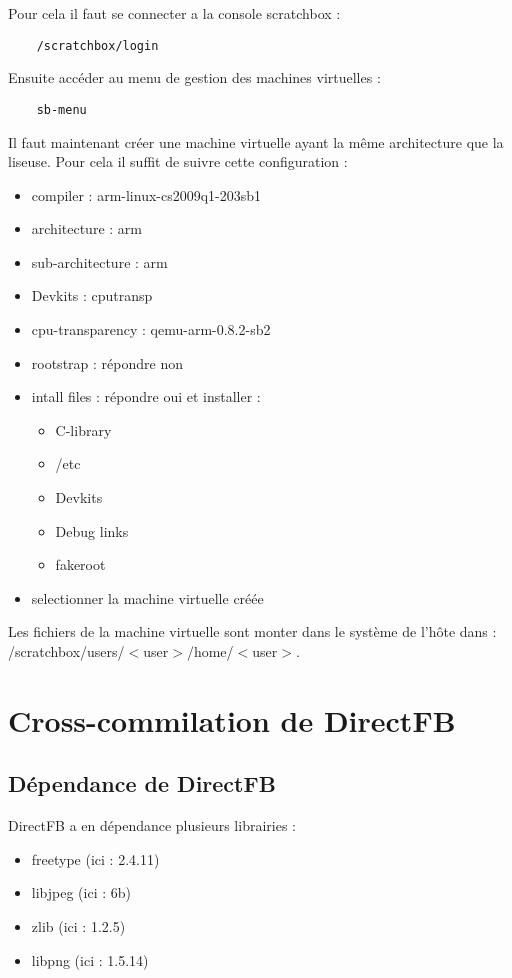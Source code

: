 Pour cela il faut se connecter a la console scratchbox : 
\begin{lstlisting}
	/scratchbox/login
\end{lstlisting}
Ensuite accéder au menu de gestion des machines virtuelles : 
\begin{lstlisting}
	sb-menu
\end{lstlisting}
Il faut maintenant créer une machine virtuelle ayant la même architecture que la liseuse. 
Pour cela il suffit de suivre cette configuration : 
\begin{itemize}
	\item compiler : arm-linux-cs2009q1-203sb1
	\item architecture : arm
	\item sub-architecture : arm
	\item Devkits : cputransp
	\item cpu-transparency :  qemu-arm-0.8.2-sb2
	\item rootstrap : répondre non
	\item intall files : répondre oui et installer :
		\begin{itemize}
			\item C-library
			\item /etc
			\item Devkits 
			\item Debug links
			\item fakeroot
		\end{itemize}
	\item selectionner la machine virtuelle créée
\end{itemize}

Les fichiers de la machine virtuelle sont monter dans le système de l’hôte dans : 
/scratchbox/users/$<$user$>$/home/$<$user$>$.

\section{Cross-commilation de DirectFB}

\subsection{Dépendance de DirectFB}
DirectFB a en dépendance plusieurs librairies : 
	\begin{itemize}
		\item freetype (ici : 2.4.11)
		\item libjpeg (ici : 6b)
		\item zlib (ici : 1.2.5)
		\item libpng (ici : 1.5.14)
	\end{itemize}

